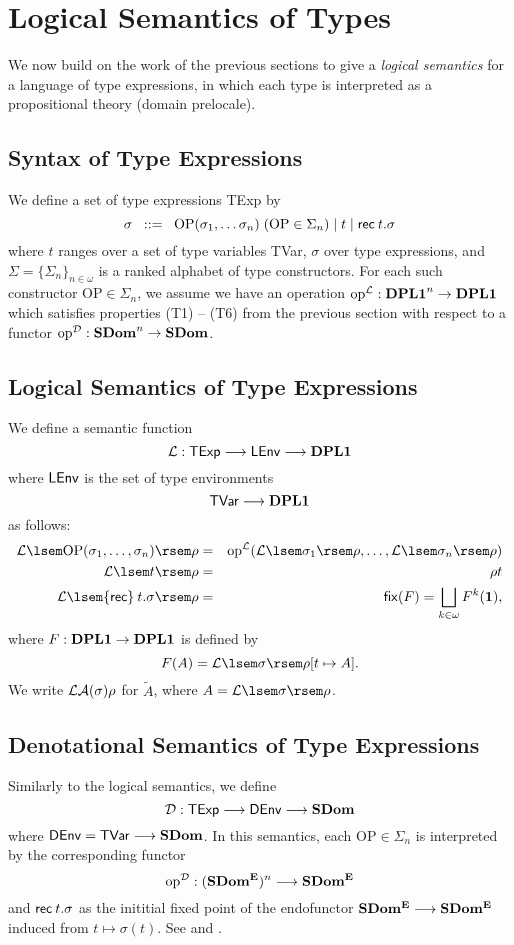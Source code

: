 \section{Logical Semantics of Types}
We now build on the work of the previous sections to give a {\it logical semantics} for a language of type expressions, in which each type is interpreted as a propositional theory (domain prelocale).
\subsection*{Syntax of Type Expressions}
We define a set of type expressions {\sf TExp} by
\[ \sigma \;\; ::= \;\; \mbox{OP}(\sigma_{1}, \ldots \sigma_{n}) \; (\mbox{OP} \in \Sigma_{n}) \; | \; t \; | \; {\sf rec} \: t. \sigma \]
where $t$ ranges over a set of type variables {\sf TVar}, $\sigma$ over type expressions, and 
$\Sigma = \{\Sigma_{n}\}_{n \in \omega}$ is a ranked alphabet of type constructors. 
For each such constructor $\mbox{OP} \in \Sigma_{n}$, we assume we have an operation ${\rm op}^{{\cal L}} : {\bf DPL1}^{n} \rightarrow {\bf DPL1}$ which satisfies properties (T1) -- (T6) from the previous section with respect to a functor ${\rm op}^{{\cal D}} : {\bf SDom}^{n} \rightarrow {\bf SDom}$.
\subsection*{Logical Semantics of Type Expressions}
We define a semantic function
\[ {\cal L} : {\sf TExp} \longrightarrow {\sf LEnv} \longrightarrow {\bf DPL1} \]
where ${\sf LEnv}$ is the set of type environments
\[ {\sf TVar} \longrightarrow {\bf DPL1} \]
as follows:
\begin{eqnarray*}
{\cal L} \lsem \mbox{OP}(\sigma_{1}, \ldots ,\sigma_{n}) \rsem \rho & = & {\rm op}^{{\cal L}}({\cal L}\lsem \sigma_{1} \rsem \rho , \ldots ,{\cal L}\lsem \sigma_{n} \rsem \rho ) \\
{\cal L} \lsem t \rsem \rho & = &  \rho t \\
{\cal L} \lsem {\sf rec} \: t. \sigma \rsem \rho & = & {\sf fix}(F) = \bigsqcup_{k \in \omega}F^{k}({\bf 1}),
\end{eqnarray*} 
where $F : {\bf DPL1} \rightarrow {\bf DPL1}$ is defined by
\[ F(A) = {\cal L} \lsem \sigma \rsem \rho [t \mapsto A]. \]
We write ${\cal LA}(\sigma ) \rho$ for $\tilde{A}$, where $A = {\cal L} \lsem
\sigma \rsem \rho$.
\subsection*{Denotational Semantics of Type Expressions}
Similarly to the logical semantics, we define
\[ {\cal D} : {\sf TExp} \longrightarrow {\sf DEnv} \longrightarrow {\bf SDom} \]
where ${\sf DEnv} = {\sf TVar} \longrightarrow {\bf SDom}$. In this semantics, each $\mbox{OP} \in \Sigma_{n}$ is interpreted by the corresponding functor
\[ \mbox{op}^{{\cal D}} : ({\bf SDom^{E}})^{n} \longrightarrow {\bf SDom^{E}} \]
and ${\sf rec} \: t. \sigma$ as the inititial fixed point of the endofunctor 
${\bf SDom^{E}} \longrightarrow {\bf SDom^{E}}$ induced from  
$t \mapsto \sigma (t)$. 
See \cite[Chapter 5]{PloLN} and \cite{SP82,Nie84}.

